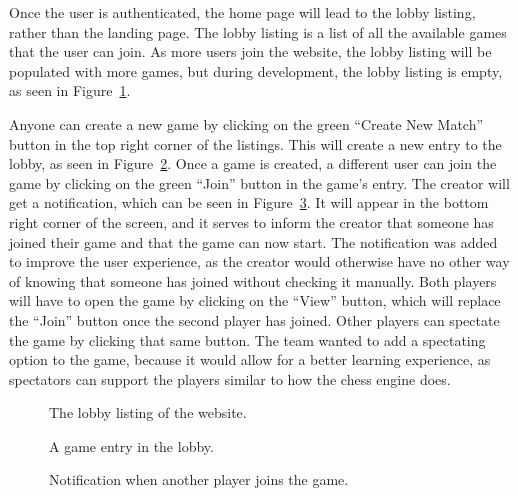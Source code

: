 Once the user is authenticated, the home page will lead to the lobby listing, rather than the landing page.
The lobby listing is a list of all the available games that the user can join.
As more users join the website, the lobby listing will be populated with more games, but during development, the lobby
listing is empty, as seen in Figure~\ref{fig:lobby-empty}.

Anyone can create a new game by clicking on the green ``Create New Match'' button in the top right corner of the
listings.
This will create a new entry to the lobby, as seen in Figure~\ref{fig:lobby-game}.
Once a game is created, a different user can join the game by clicking on the green ``Join'' button in the game's entry.
The creator will get a notification, which can be seen in Figure~\ref{fig:lobby-join}.
It will appear in the bottom right corner of the screen, and it serves to inform the creator that someone has joined
their game and that the game can now start.
The notification was added to improve the user experience, as the creator would otherwise have no other way of knowing
that someone has joined without checking it manually.
Both players will have to open the game by clicking on the ``View'' button, which will replace the ``Join'' button once
the second player has joined.
Other players can spectate the game by clicking that same button.
The team wanted to add a spectating option to the game, because it would allow for a better learning experience, as
spectators can support the players similar to how the chess engine does.

\begin{figure}[H]
    \centering
    \setlength{\fboxsep}{0pt}
    \caption{The lobby listing of the website.}\label{fig:lobby-empty}
\end{figure}

\begin{figure}[H]
    \centering
    \setlength{\fboxsep}{0pt}
    \caption{A game entry in the lobby.}\label{fig:lobby-game}
\end{figure}

\begin{figure}[H]
    \centering
    \setlength{\fboxsep}{0pt}
    \caption{Notification when another player joins the game.}\label{fig:lobby-join}
\end{figure}

